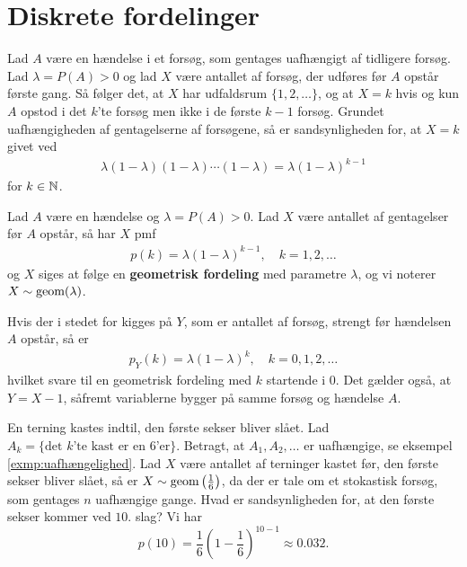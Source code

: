 \section{Diskrete fordelinger}
Lad $A$ være en hændelse i et forsøg, som gentages uafhængigt af tidligere forsøg. Lad $\lambda = P(A) > 0$ og lad $X$ være antallet af forsøg, der udføres før $A$ opstår første gang. Så følger det, at $X$ har udfaldsrum $\{1, 2, \ldots\}$, og at $X = k$ hvis og kun $A$ opstod i det $k$'te forsøg men ikke i de første $k - 1$ forsøg. Grundet uafhængigheden af gentagelserne af forsøgene, så er sandsynligheden for, at $X = k$ givet ved
\begin{align*}
    \lambda(1-\lambda)(1-\lambda)\cdots (1-\lambda) =\lambda(1-\lambda)^{k-1}
\end{align*}
for $k \in \mathbb{N}$.
\begin{defn} \label{def:2.14} %
  Lad $A$ være en hændelse og $\lambda = P(A) > 0$. Lad $X$ være antallet af gentagelser før $A$ opstår, så har $X$ pmf
  \begin{align*}
    p(k)=\lambda(1-\lambda)^{k-1}, \quad k=1,2,\ldots 
  \end{align*}
  og $X$ siges at følge en \textbf{geometrisk fordeling} med parametre $\lambda$, og vi noterer $X\sim\textnormal{geom}(\lambda)$.
\end{defn}
Hvis der i stedet for kigges på $Y$, som er antallet af forsøg, strengt før hændelsen $A$ opstår, så er
\begin{align*}
    p_{Y}(k)=\lambda(1-\lambda)^{k}, \quad k=0,1,2,\ldots
\end{align*}
hvilket svare til en geometrisk fordeling med $k$ startende i $0$. Det gælder også, at $Y=X-1$, såfremt variablerne bygger på samme forsøg og hændelse $A$.

\begin{exmp}
En terning kastes indtil, den første sekser bliver slået. Lad $A_k = \{\text{det } k \text{'te kast er en 6'er}\}$. Betragt, at $A_1, A_2, \ldots$ er uafhængige, se eksempel \ref{exmp:uafhængelighed}. Lad $X$ være antallet af terninger kastet før, den første sekser bliver slået, så er $X \sim \textnormal{geom}\left(\tfrac{1}{6}\right)$, da der er tale om et stokastisk forsøg, som gentages $n$ uafhængige gange. Hvad er sandsynligheden for, at den første sekser kommer ved $10.$ slag? Vi har 
\begin{equation*}
    p(10) = \frac{1}{6} \left(1-\frac{1}{6}\right)^{10 - 1} \approx 0.032.
\end{equation*}
\end{exmp}


